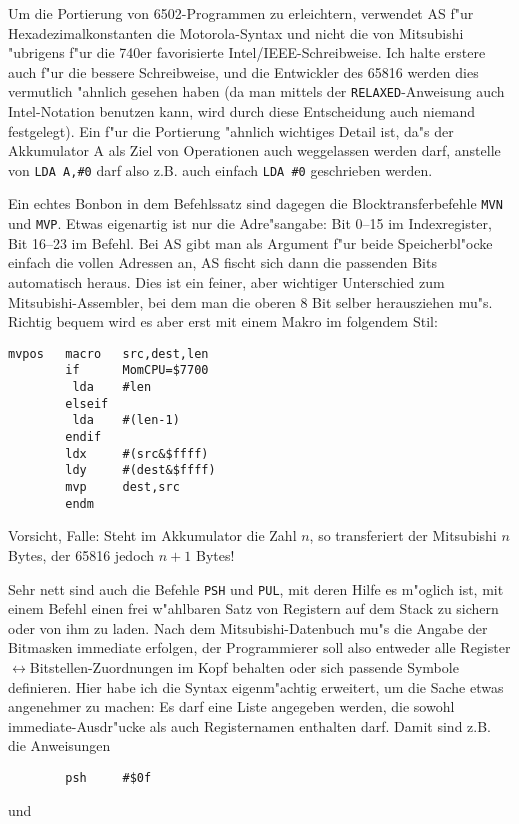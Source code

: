 \documentclass[12pt,a4paper,twoside]{report}
\newcommand{\tty}[1]{{\tt #1}}
\begin{document}
{Um die Portierung von 6502-Programmen zu erleichtern, verwendet AS f"ur
Hexadezimalkonstanten die Motorola-Syntax und nicht die von Mitsubishi
"ubrigens f"ur die 740er favorisierte Intel/IEEE-Schreibweise.
Ich halte erstere auch f"ur die bessere Schreibweise, und die Entwickler
des 65816 werden dies vermutlich "ahnlich gesehen haben (da man mittels
der \tty{RELAXED}-Anweisung auch Intel-Notation benutzen kann, wird durch
diese Entscheidung auch niemand festgelegt).  Ein f"ur die
Portierung "ahnlich wichtiges Detail ist, da"s der Akkumulator A als
Ziel von Operationen auch weggelassen werden darf, anstelle von
\tty{LDA A,\#0} darf also z.B. auch einfach \tty{LDA \#0} geschrieben
werden.
\par
Ein echtes Bonbon in dem Befehlssatz sind dagegen die Blocktransferbefehle
\tty{MVN} und \tty{MVP}.  Etwas eigenartig ist nur die Adre"sangabe:
Bit 0--15 im Indexregister, Bit 16--23 im Befehl.  Bei AS gibt  man als
Argument f"ur beide Speicherbl"ocke einfach die vollen Adressen an, AS
fischt sich dann die passenden Bits automatisch heraus.  Dies ist ein
feiner, aber wichtiger Unterschied zum Mitsubishi-Assembler, bei dem
man die oberen 8 Bit selber herausziehen mu"s.  Richtig bequem
wird es aber erst mit einem Makro im folgendem Stil:
\begin{verbatim}
mvpos   macro   src,dest,len
        if      MomCPU=$7700
         lda    #len
        elseif
         lda    #(len-1)
        endif
        ldx     #(src&$ffff)
        ldy     #(dest&$ffff)
        mvp     dest,src
        endm
\end{verbatim}
Vorsicht, Falle: Steht im Akkumulator die Zahl $n$, so transferiert
der Mitsubishi $n$ Bytes, der 65816 jedoch $n+1$ Bytes!
\par
Sehr nett sind auch die Befehle \tty{PSH} und \tty{PUL}, mit deren Hilfe es
m"oglich ist, mit einem Befehl einen frei w"ahlbaren Satz von Registern
auf dem Stack zu sichern oder von ihm zu laden.  Nach dem
Mitsubishi-Datenbuch\cite{Mit16} mu"s die Angabe der Bitmasken immediate
erfolgen, der Programmierer soll also entweder alle
Register$\leftrightarrow$Bitstellen-Zuordnungen im Kopf behalten oder
sich passende Symbole definieren.  Hier habe ich die Syntax eigenm"achtig
erweitert, um die Sache etwas angenehmer zu machen: Es darf eine Liste
angegeben werden, die sowohl immediate-Ausdr"ucke als auch Registernamen
enthalten darf.  Damit sind z.B. die Anweisungen
\begin{verbatim}
        psh     #$0f
\end{verbatim}
und
\begin{verbatim}

\end{verbatim}}
\end{document}
